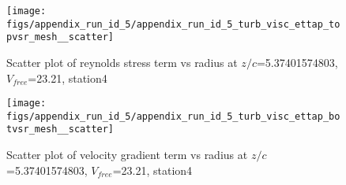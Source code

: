 \begin{figure}[H]
\centering
\texttt{[image: figs/appendix\_run\_id\_5/appendix\_run\_id\_5\_turb\_visc\_ettap\_topvsr\_mesh\_\_scatter]}
\caption{Scatter plot of reynolds stress term vs radius at $z/c$=5.37401574803, $V_{free}$=23.21, station4}
\label{fig:appendix_run_id_5_turb_visc_ettap_topvsr_mesh__scatter}
\end{figure}


\begin{figure}[H]
\centering
\texttt{[image: figs/appendix\_run\_id\_5/appendix\_run\_id\_5\_turb\_visc\_ettap\_botvsr\_mesh\_\_scatter]}
\caption{Scatter plot of velocity gradient term vs radius at $z/c$=5.37401574803, $V_{free}$=23.21, station4}
\label{fig:appendix_run_id_5_turb_visc_ettap_botvsr_mesh__scatter}
\end{figure}


